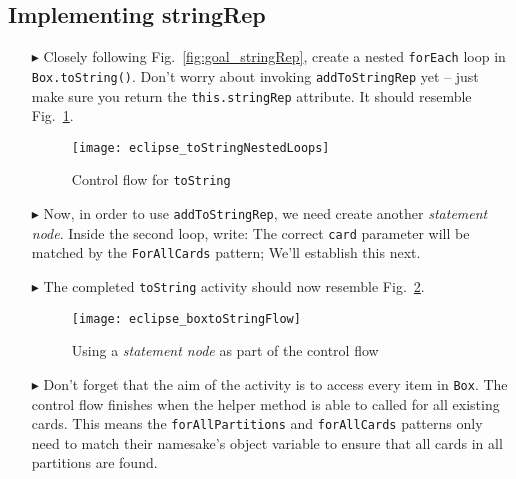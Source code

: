 \newpage
\hypertarget{stringRep tex}{}
\subsection{Implementing stringRep}
\texHeader

\vspace{0.5cm}

\begin{itemize}
  
\item[$\blacktriangleright$] Closely following Fig.~\ref{fig:goal_stringRep}, create a nested \texttt{forEach} loop in \texttt{Box.toString()}.
Don't worry about invoking \texttt{addToStringRep} yet -- just make sure you return the \texttt{this.stringRep} attribute. It should resemble
Fig.~\ref{fig:emptyLoops}.

\begin{figure}[htp]
\begin{center}
  \texttt{[image: eclipse\_toStringNestedLoops]}
  \caption{Control flow for \texttt{toString}}
  \label{fig:emptyLoops}
\end{center}
\end{figure}

\item[$\blacktriangleright$] Now, in order to use \texttt{addToStringRep}, we need create another \emph{statement node}. Inside the second loop, write:
The correct \texttt{card} parameter will be matched by the \texttt{ForAllCards} pattern; We'll establish this next.

\vspace{0.5cm}

\item[$\blacktriangleright$] The completed \texttt{toString} activity should now resemble Fig.~\ref{fig:toStringFlow}.

\vspace{0.5cm}

\begin{figure}[htp]
\begin{center}
  \texttt{[image: eclipse\_boxtoStringFlow]}
  \caption{Using a \emph{statement node} as part of the control flow}
  \label{fig:toStringFlow}
\end{center}
\end{figure}

\item[$\blacktriangleright$] Don't forget that the aim of the activity is to access every item in \texttt{Box}. The control flow finishes when the helper
method is able to called for all existing cards. This means the \texttt{forAllPartitions} and \texttt{forAllCards} patterns only need to match their
namesake's object variable to ensure that all cards in all partitions are found.


\end{itemize}
